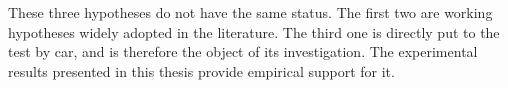 These three hypotheses do not have the same status.
The first two are working hypotheses widely adopted in the literature.
The third one is directly put to the test by \gls{car}, and is therefore the object of its investigation.
The experimental results presented in this thesis provide empirical support for it.
